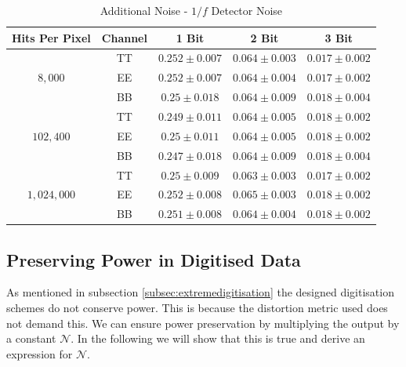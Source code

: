 \documentclass[apj]{emulateapj}
\begin{document}
\def\arraystretch{1.3}
\begin{table}[tbh]
\begin{center}
\caption{\label{tab:extranoiseoof} Additional Noise - $1/f$ Detector Noise}
\small
\begin{tabular}{c c c c c}
Hits Per Pixel & Channel & 1 Bit & 2 Bit & 3 Bit \\
\hline
\hline
\multirow{3}{*}{$8,000$}  & TT  & $ 0.252 \pm 0.007 $  & $ 0.064 \pm 0.003 $  & $ 0.017 \pm 0.002 $ \\
& EE  & $ 0.252 \pm 0.007 $  & $ 0.064 \pm 0.004 $  & $ 0.017 \pm 0.002 $ \\
& BB  & $ 0.25 \pm 0.018 $  & $ 0.064 \pm 0.009 $  & $ 0.018 \pm 0.004 $ \\
\hline
\multirow{3}{*}{$102,400$}  & TT  & $ 0.249 \pm 0.011 $  & $ 0.064 \pm 0.005 $  & $ 0.018 \pm 0.002 $ \\
& EE  & $ 0.25 \pm 0.011 $  & $ 0.064 \pm 0.005 $  & $ 0.018 \pm 0.002 $ \\
& BB  & $ 0.247 \pm 0.018 $  & $ 0.064 \pm 0.009 $  & $ 0.018 \pm 0.004 $ \\
\hline
\multirow{3}{*}{$1,024,000$}  & TT  & $ 0.25 \pm 0.009 $  & $ 0.063 \pm 0.003 $  & $ 0.017 \pm 0.002 $ \\
& EE  & $ 0.252 \pm 0.008 $  & $ 0.065 \pm 0.003 $  & $ 0.018 \pm 0.002 $ \\
& BB  & $ 0.251 \pm 0.008 $  & $ 0.064 \pm 0.004 $  & $ 0.018 \pm 0.002 $ \\
\end{tabular}
 \normalsize
\end{center}
\end{table}


\subsection{Preserving Power in Digitised Data}
\label{subsec:appendixpreservepower}

As mentioned in subsection \ref{subsec:extremedigitisation} the designed digitisation schemes do not conserve power. This is because the distortion metric used does not demand this. We can ensure power preservation by multiplying the output by a constant $\mathcal{N}$. In the following we will show that this is true and derive an expression for $\mathcal{N}$.
\end{document}
